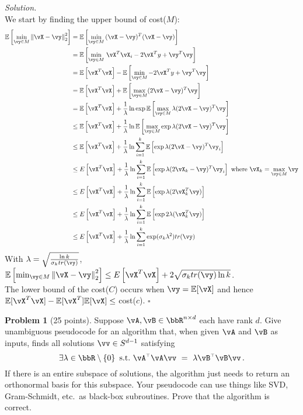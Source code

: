 \documentclass[11pt]{article}
\renewcommand\t{{\ensuremath{\scriptscriptstyle{\top}}}}
\newcommand{\E}{\ensuremath{\mathbb{E}}} %
\newcommand{\unitsphere}[1][d-1]{\ensuremath{S^{#1}}} %
\theoremstyle{definition}
\newtheorem{problem}{Problem}
\newenvironment{solution}{\noindent\emph{Solution.}}{\hfill$\square$}
\begin{document}
\begin{solution}
\\
We start by finding the upper bound of cost($M$):
\begin{align*}
\E \sbr{ \min_{\vy \in M} \, \norm{\vX - \vy}_2^2 }
&= \E \sbr{ \min_{\vy \in M} \, (\vX - \vy)^T (\vX  - \vy)} \\
&= \E \sbr{ \min_{\vy \in M} \, \vX^T \vX_i - 2 \vX^T y + \vy^T \vy} \\
&= \E \sbr {\vX^T \vX} - \E \sbr{ \min_{\vy \in M}  -2 \vX^T y + \vy^T \vy} \\
&= \E \sbr {\vX^T \vX} + \E \sbr{ \max_{\vy \in M}  (2 \vX - \vy)^T \vy} \\
&= \E \sbr {\vX^T \vX} +  \frac{1}{\lambda} \ln \exp \E \sbr{ \max_{\vy \in M}  \lambda (2 \vX - \vy)^T \vy} \\
&\leq \E \sbr {\vX^T \vX} +  \frac{1}{\lambda} \ln \E \sbr{ \max_{\vy \in M}  \exp \lambda (2 \vX - \vy)^T \vy} \\
&\leq \E \sbr {\vX^T \vX} +  \frac{1}{\lambda} \ln \sum_{i=1}^k \E \sbr{ \exp \lambda (2 \vX - \vy)^T \vy_i} \\
&\leq E \sbr {\vX^T \vX} +  \frac{1}{\lambda} \ln \sum_{i=1}^k \E \sbr{ \exp \lambda (2 \vX_k - \vy)^T \vy_i} \textrm{ where } \vX_k = \max_{\vy \in M} \vy \\
&\leq E \sbr {\vX^T \vX} +  \frac{1}{\lambda} \ln \sum_{i=1}^k \E \sbr{ \exp \lambda (2 \vX_k^T \vy)} \\
&\leq E \sbr {\vX^T \vX} +  \frac{1}{\lambda} \ln \sum_{i=1}^k \E \sbr{ \exp 2 \lambda (\vX_k^T \vy)} \\
&\leq E \sbr {\vX^T \vX} +  \frac{1}{\lambda} \ln \sum_{i=1}^k \exp (\sigma_k \lambda^2) tr(\vy) \\
\end{align*}
With $\lambda = \sqrt{\frac{\ln k}{\sigma_k tr(\vy) }}$, $\E \sbr{ \min_{\vy \in M} \, \norm{\vX - \vy}_2^2 } \leq E \sbr {\vX^T \vX} + 2\sqrt{\sigma_k tr(\vy) \ln k}$.
\\
The lower bound of the cost($C$) occurs when $\vy = \E[\vX]$ and hence $\E[\vX^T \vX]  - \E[\vX^T]\E[\vX] \leq$ cost($c$).
\end{solution}

\newpage


\begin{problem}[25 points]
  Suppose $\vA, \vB \in \bbR^{n \times d}$ each have rank $d$.
  Give unambiguous pseudocode for an algorithm that, when given $\vA$ and $\vB$
  as inputs, finds all solutions $\vv \in \unitsphere$ satisfying
  \[
    \exists \lambda \in \bbR \setminus \cbr{0} \ \text{s.t.} \
    \vA^\t\vA \vv \ = \ \lambda \vB^\t \vB \vv
    \,.
  \]
  If there is an entire subspace of solutions, the algorithm just needs to
  return an orthonormal basis for this subspace.
  Your pseudocode can use things like SVD, Gram-Schmidt, etc.~as black-box
  subroutines.
  Prove that the algorithm is correct.
\end{problem}
\end{document}
